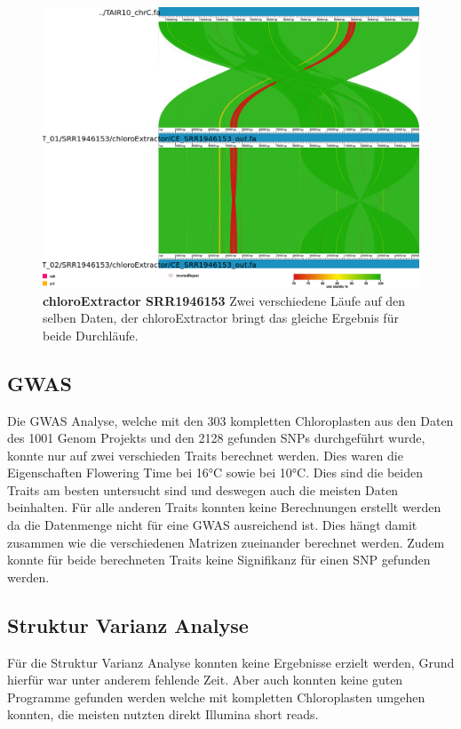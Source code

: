 \documentclass{scrartcl}
\begin{document}
\begin{figure}
\includegraphics[width=.9\linewidth]{./SRR1946153_CE.png}
\caption[chloroExtractor SRR1946153]{\textbf{chloroExtractor SRR1946153} Zwei verschiedene Läufe auf den selben Daten, der chloroExtractor bringt das gleiche Ergebnis für beide Durchläufe.}
\end{figure}
\subsection{GWAS}
\label{sec-4-8}
Die GWAS Analyse, welche mit den 303 kompletten Chloroplasten aus den Daten des 1001 Genom Projekts und den 2128 gefunden SNPs durchgeführt wurde, konnte nur auf zwei verschieden Traits berechnet werden. Dies waren 
die Eigenschaften Flowering Time bei 16°C sowie bei 10°C. Dies sind die beiden Traits am besten untersucht sind und deswegen auch die meisten Daten beinhalten. Für alle anderen Traits konnten
keine Berechnungen erstellt werden da die Datenmenge nicht für eine GWAS ausreichend ist. Dies hängt damit zusammen wie die verschiedenen Matrizen zueinander berechnet werden.
Zudem konnte für beide berechneten Traits keine Signifikanz für einen SNP gefunden werden.
\subsection{Struktur Varianz Analyse}
\label{sec-4-9}
Für die Struktur Varianz Analyse konnten keine Ergebnisse erzielt werden, Grund hierfür war unter anderem fehlende Zeit. Aber auch konnten keine guten Programme gefunden werden welche mit kompletten Chloroplasten
umgehen konnten, die meisten nutzten direkt Illumina short reads. 
\end{document}
